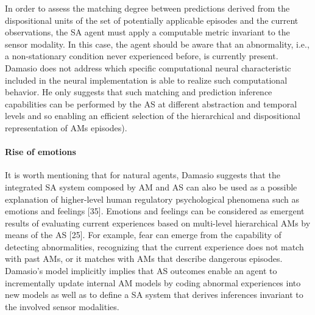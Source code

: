 \documentclass{article}
\begin{document}
			In order to assess the matching degree between predictions derived from the dispositional units of the set of potentially applicable episodes and the current observations, the SA agent must apply a computable metric invariant to the sensor modality. In this case, the agent should be aware that an
			abnormality, i.e., a non-stationary condition never experienced before, is currently present. Damasio does not address which specific computational neural characteristic included in the
			neural implementation is able to realize such computational behavior. He only suggests that such matching and prediction inference capabilities can be performed by the AS at different
			abstraction and temporal levels and so enabling an efficient selection of the hierarchical and dispositional representation of AMs episodes).
			\paragraph{Rise of emotions} It is worth mentioning that for natural agents, Damasio suggests that the integrated SA system composed by AM and AS can also be used as a possible explanation of higher-level human regulatory psychological phenomena such as emotions
			and feelings [35]. Emotions and feelings can be considered as emergent results of evaluating current experiences based on multi-level hierarchical AMs by means of the AS [25].
			For example, fear can emerge from the capability of detecting abnormalities, recognizing that the current experience does not match with past AMs, or it matches with AMs that describe
			dangerous episodes. Damasio’s model implicitly implies that AS outcomes enable an agent to incrementally update internal AM models by coding abnormal experiences into new models as well as to define a SA system that derives inferences invariant to the involved sensor modalities.
			
			
\end{document}
